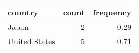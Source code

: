 \begin{table}[!h]
\centering
\begin{tabular}[t]{lrr}
\toprule
country & count & frequency\\
\midrule
Japan & 2 & 0.29\\
United States & 5 & 0.71\\
\bottomrule
\end{tabular}
\end{table}
